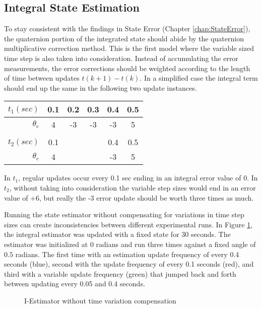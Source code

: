 \subsection{Integral State Estimation}
\label{subsec:IntegralEstimator}

To stay consistent with the findings in State Error (Chapter \ref{chap:StateError}), the quaternion portion of the integrated state should abide by the quaternion multiplicative correction method.  This is the first model where the variable sized time step is also taken into consideration.  Instead of accumulating the error measurements, the error corrections should be weighted according to the length of time between updates $t(k+1) - t(k)$.  In a simplified case the integral term should end up the same in the following two update instances.

\begin{table}[H]
  \centering
  \begin{tabular}{r|c|c|c|c|c}
    $t_1 (sec)$ & 0.1 & 0.2 & 0.3 & 0.4 & 0.5 \\ \hline
    $\theta_e$ & 4 & -3 & -3 & -3 & 5 \\
    \\
    $t_2 (sec)$ & 0.1 & & & 0.4 & 0.5 \\ \hline
    $\theta_e$ & 4 &  &  & -3 & 5 \\
  \end{tabular}
  \label{tbl:VariableUpdates}
\end{table}

In $t_1$, regular updates occur every 0.1 sec ending in an integral error value of 0.  In $t_2$, without taking into consideration the variable step sizes would end in an error value of $+6$, but really the -3 error update should be worth three times as much.

Running the state estimator without compensating for variations in time step sizes can create inconsistencies between different experimental runs.  In Figure \ref{fig:IEstimatorwithouttimevariationcompensation}, the integral estimator was updated with a fixed state for 30 seconds.  The estimator was initialized at $0$ radians and run three times against a fixed angle of $0.5$ radians.  The first time with an estimation update frequency of every 0.4 seconds (blue), second with the update frequency of every 0.1 seconds (red), and third with a variable update frequency (green) that jumped back and forth between updating every 0.05 and 0.4 seconds.

\begin{figure}[H]
  \centerline{}
  \caption{I-Estimator without time variation compensation}
  \label{fig:IEstimatorwithouttimevariationcompensation}
\end{figure}

